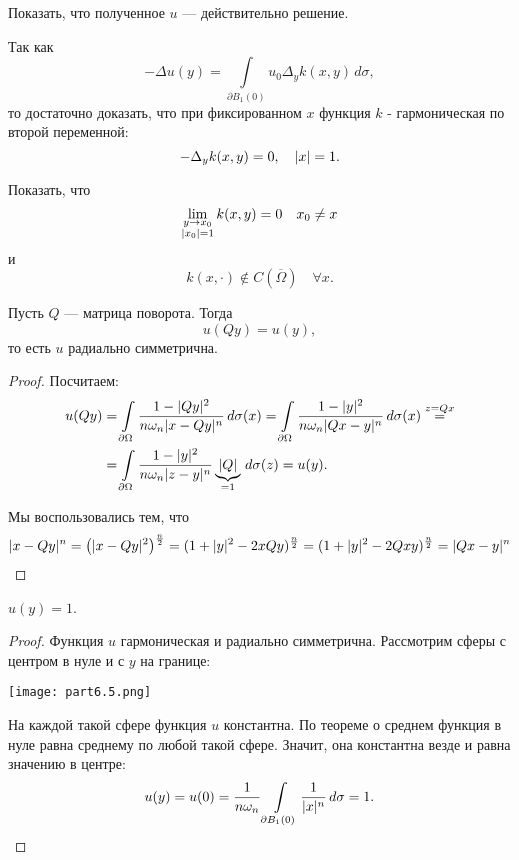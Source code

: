 \begin{exercise} Показать, что полученное $u$ --- действительно решение.
\end{exercise}
\begin{note}Так как
$$- \Delta u(y) = \int \limits_{\partial B_1 (0)} u_0 \Delta_y k(x, y) \, d\sigma,$$
то достаточно доказать, что при фиксированном $x$ функция $k$ - гармоническая по второй переменной:
$$ - \Delta_y k(x,y) = 0, \quad \lvert x\rvert = 1.$$
\end{note}

\begin{exercise} Показать, что
$$ \lim_{\substack{y \to x_0 \\ \lvert x_0\rvert = 1}} k(x, y) = 0 \quad x_0 \neq x$$
и
$$ k( x, \cdot) \notin C(\overline{\Omega}) \quad \forall x.$$
\end{exercise}

\begin{note}Пусть $Q$ --- матрица поворота. Тогда
$$ u(Qy) = u(y),$$
то есть $u$ радиально симметрична.
\end{note}
\begin{proof}
Посчитаем:
\begin{align*}
	u(Qy) &= \int \limits_{\partial \Omega} \frac {1 - \lvert Qy\rvert^2} {n \omega_n \lvert x-Qy\rvert^n} \, d\sigma(x) = \int \limits_{\partial \Omega} \frac {1 - \lvert y\rvert^2} {n \omega_n \lvert Qx-y\rvert^n} \, d\sigma(x) \stackrel{z = Qx} = \\
	&= \int \limits_{\partial \Omega} \frac {1 - \lvert y\rvert^2} {n \omega_n \lvert z - y\rvert^n} \underbrace {\lvert Q\rvert}_{=1} \, d\sigma(z) = u(y). 
\end{align*}

Мы воспользовались тем, что
\begin{align*}
	\lvert x-Qy\rvert^n = \left( \lvert x-Qy\rvert^2 \right)^{\frac {n} {2}} = (1 + \lvert y\rvert^2 - 2 x Q y)^{\frac {n} {2}} = (1 + \lvert y\rvert^2 - 2Qxy)^{\frac {n} {2}} = \lvert Qx - y\rvert^n
\end{align*}

\end{proof}

\begin{note} $u(y) = 1$.
\end{note}
\begin{proof}
Функция $u$ гармоническая и радиально симметрична. Рассмотрим сферы с центром в нуле и с $y$ на границе:
\begin{center}
\texttt{[image: part6.5.png]}
\end{center}
На каждой такой сфере функция $u$ константна. По теореме о среднем функция в нуле равна среднему по любой такой сфере. Значит, она константна везде и равна значению в центре:
$$ u(y) = u(0) = \frac {1} {n \omega_n} \int \limits_{\partial B_1 (0)} \frac {1} {\lvert x\rvert^n} \, d\sigma = 1.$$

\end{proof}

